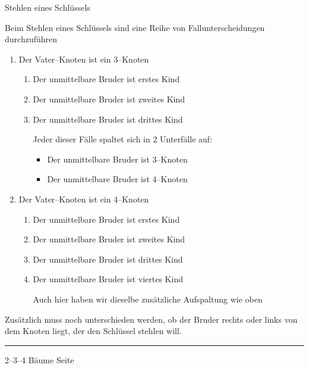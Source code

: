 \begin{slide}{}
\normalsize

\begin{center}
Stehlen eines Schl\"ussels
\end{center}
\vspace*{0.5cm}

\footnotesize
Beim Stehlen eines Schl\"ussels sind eine Reihe von Fallunterscheidungen
durchzuf\"uhren
\begin{enumerate}
\item Der Vater--Knoten ist ein 3--Knoten
      \begin{enumerate}
      \item Der unmittelbare Bruder ist erstes Kind
      \item Der unmittelbare Bruder ist zweites Kind
      \item Der unmittelbare Bruder ist drittes Kind
            \vspace*{0.5cm} 

      Jeder dieser F\"alle spaltet sich in 2 Unterf\"alle auf:
      \begin{itemize}
      \item Der unmittelbare Bruder ist 3--Knoten 
      \item Der unmittelbare Bruder ist 4--Knoten 
      \end{itemize}
      \end{enumerate}
\item Der Vater--Knoten ist ein 4--Knoten
      \begin{enumerate}
      \item Der unmittelbare Bruder ist erstes Kind
      \item Der unmittelbare Bruder ist zweites Kind
      \item Der unmittelbare Bruder ist drittes Kind
      \item Der unmittelbare Bruder ist viertes Kind
            \vspace*{0.5cm} 

       Auch hier haben wir dieselbe zus\"atzliche Aufspaltung wie oben
    \end{enumerate}
\end{enumerate}
Zus\"atzlich muss noch unterschieden werden, ob der Bruder rechts oder links
von dem Knoten liegt, der den Schl\"ussel stehlen will.

\begin{center}
\end{center}

\vspace*{\fill}
\tiny \addtocounter{mypage}{1}
\rule{17cm}{1mm}
2--3--4 B\"aume  \hspace*{\fill} Seite 
\end{slide}

